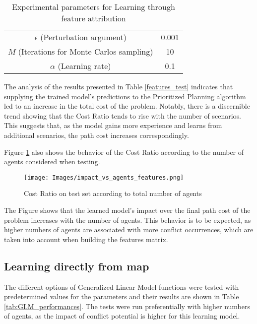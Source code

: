 \begin{table}[!ht]
    \centering
    \caption{Experimental parameters for Learning through feature attribution}
    \begin{tabular}{|c|c|}
    \hline
        $\epsilon$ (Perturbation argument) & 0.001 \\
        $M$ (Iterations for Monte Carlos sampling) & 10 \\
        $\alpha$ (Learning rate) & 0.1 \\
    \hline
    \end{tabular}
    \label{tab:features_parameters}
\end{table}

The analysis of the results presented in Table \ref{features_test} indicates that supplying the trained model's predictions to the Prioritized Planning algorithm led to an increase in the total cost of the problem. Notably, there is a discernible trend showing that the Cost Ratio tends to rise with the number of scenarios. This suggests that, as the model gains more experience and learns from additional scenarios, the path cost increases correspondingly.

Figure \ref{fig:graphic_features} also shows the behavior of the Cost Ratio according to the number of agents considered when testing.

\begin{figure}[!ht]
    \centering
    \texttt{[image: Images/impact\_vs\_agents\_features.png]}
    \caption{Cost Ratio on test set according to total number of agents}
    \label{fig:graphic_features}
\end{figure}

The Figure shows that the learned model's impact over the final path cost of the problem increases with the number of agents. This behavior is to be expected, as higher numbers of agents are associated with more conflict occurrences, which are taken into account when building the features matrix.

\subsection{Learning directly from map}

The different options of Generalized Linear Model functions were tested with predetermined values for the parameters and their results are shown in Table \ref{tab:GLM_performances}.
The tests were run preferentially with higher numbers of agents, as the impact of conflict potential is higher for this learning model.

